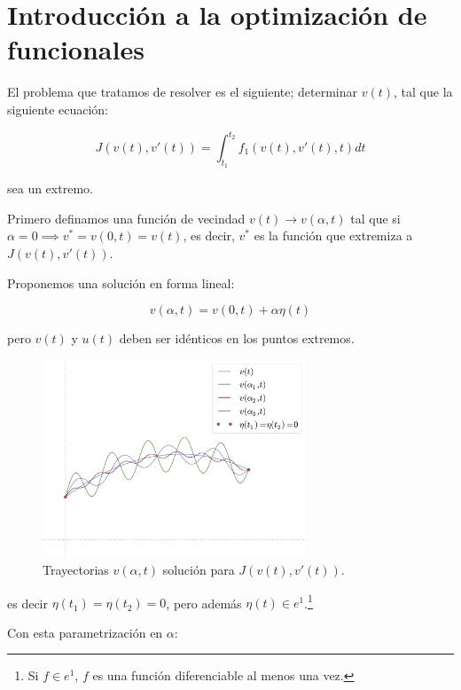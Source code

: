 
\chapter{Introducción a la optimización de funcionales}

    El problema que tratamos de resolver es el siguiente; determinar $v(t)$, tal que la siguiente ecuación:

    \begin{equation} \label{eq:opfun1}
        J(v(t), v'(t)) = \int_{t_1}^{t_2} f_1(v(t), v'(t), t) dt
    \end{equation}

    sea un extremo.

    Primero definamos una función de vecindad $v(t) \to v(\alpha, t)$ tal que si $\alpha = 0 \implies v^* = v(0, t) = v(t)$, es decir, $v^*$ es la función que extremiza a $J(v(t), v'(t))$.

    Proponemos una solución en forma lineal:

    \begin{equation}
        v(\alpha, t) = v(0, t) + \alpha \eta(t)
    \end{equation}

    pero $v(t)$ y $u(t)$ deben ser idénticos en los puntos extremos.

    \begin{figure}
        \centering
        \includegraphics[width=0.7\textwidth]{./imagenes/trayectorias.pdf}
        \caption{\label{fig:trayectorias}Trayectorias $v(\alpha, t)$ solución para $J(v(t), v'(t))$.}
    \end{figure}

    es decir $\eta(t_1) = \eta(t_2) = 0$, pero además $\eta(t) \in e^1$.\footnote{Si $f \in e^1$, $f$ es una función diferenciable al menos una vez.}

    Con esta parametrización en $\alpha$:

